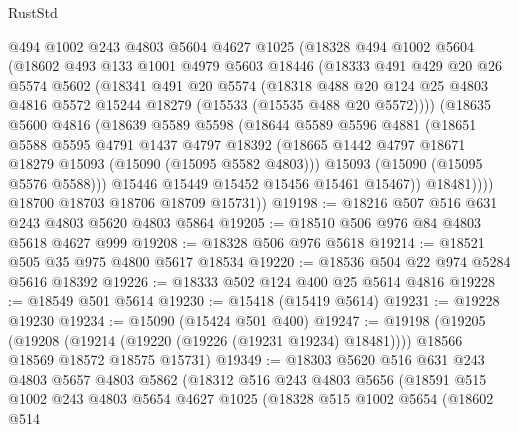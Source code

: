 \begin{lexlean}{RustStd}
\begin{coremodule}
        @494
        @1002
        @243
        @4803
        @5604
        @4627
        @1025
        (@18328
          @494
          @1002
          @5604
          (@18602
            @493
            @133
            @1001
            @4979
            @5603
            @18446
            (@18333
              @491
              @429
              @20
              @26
              @5574
              @5602
              (@18341
                @491
                @20
                @5574
                (@18318
                  @488
                  @20
                  @124
                  @25
                  @4803
                  @4816
                  @5572
                  @15244
                  @18279
                  (@15533 (@15535 @488 @20 @5572))))
              (@18635
                @5600
                @4816
                (@18639
                  @5589
                  @5598
                  (@18644
                    @5589
                    @5596
                    @4881
                    (@18651
                      @5588
                      @5595
                      @4791
                      @1437
                      @4797
                      @18392
                      (@18665 @1442 @4797 @18671 @18279 @15093 (@15090 (@15095 @5582 @4803)))
                      @15093
                      (@15090 (@15095 @5576 @5588)))
                    @15446
                    @15449
                    @15452
                    @15456
                    @15461
                    @15467))
                @18481))))
        @18700
        @18703
        @18706
        @18709
        @15731))
@19198 := @18216 @507 @516 @631 @243 @4803 @5620 @4803 @5864
@19205 := @18510 @506 @976 @84 @4803 @5618 @4627 @999
@19208 := @18328 @506 @976 @5618
@19214 := @18521 @505 @35 @975 @4800 @5617 @18534
@19220 := @18536 @504 @22 @974 @5284 @5616 @18392
@19226 := @18333 @502 @124 @400 @25 @5614 @4816
@19228 := @18549 @501 @5614
@19230 := @15418 (@15419 @5614)
@19231 := @19228 @19230
@19234 := @15090 (@15424 @501 @400)
@19247 := @19198
    (@19205
      (@19208 (@19214 (@19220 (@19226 (@19231 @19234) @18481))))
      @18566
      @18569
      @18572
      @18575
      @15731)
@19349 := @18303
    @5620
    @516
    @631
    @243
    @4803
    @5657
    @4803
    @5862
    (@18312
      @516
      @243
      @4803
      @5656
      (@18591
        @515
        @1002
        @243
        @4803
        @5654
        @4627
        @1025
        (@18328
          @515
          @1002
          @5654
          (@18602
            @514

\end{coremodule}
\end{lexlean}
